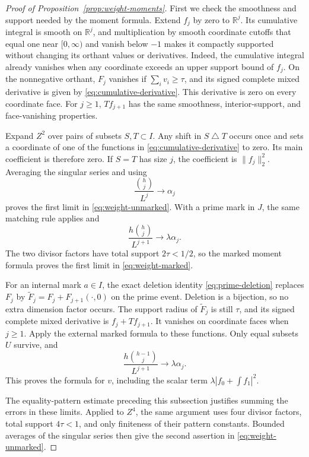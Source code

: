 \begin{proof}[Proof of Proposition~\ref{prop:weight-moments}]
First we check the smoothness and support needed by the moment
formula.  Extend $f_j$ by zero to $\mathbb R^j$.  Its cumulative integral
is smooth on $\mathbb R^j$, and multiplication by smooth coordinate
cutoffs that equal one near $[0,\infty)$ and vanish below $-1$ makes it
compactly supported without changing its orthant values or derivatives.
Indeed, the cumulative integral already vanishes when any coordinate
exceeds an upper support bound of $f_j$.  On the nonnegative orthant,
$F_j$ vanishes if $\sum_i v_i\ge\tau$, and its signed complete mixed derivative is given by
\eqref{eq:cumulative-derivative}.
This derivative is zero on every coordinate face.  For $j\ge1$,
$Tf_{j+1}$ has the same smoothness, interior-support, and face-vanishing
properties.

Expand $Z^2$ over pairs of subsets $S,T\subset I$.  Any shift in
$S\mathbin\triangle T$ occurs once and sets a coordinate of one of the
functions in \eqref{eq:cumulative-derivative} to zero.  Its main
coefficient is therefore zero.  If $S=T$ has size $j$, the coefficient
is $\|f_j\|_2^2$.  Averaging the singular series and using
\[
 \frac{\binom hj}{L^j}\longrightarrow\alpha_j
\]
proves the first limit in \eqref{eq:weight-unmarked}.  With a prime mark
in $J$, the same matching rule applies and
\[
 \frac{h\binom hj}{L^{j+1}}\longrightarrow\lambda\alpha_j.
\]
The two divisor factors have total support $2\tau<1/2$, so the marked
moment formula proves the first limit in \eqref{eq:weight-marked}.

For an internal mark $a\in I$, the exact deletion identity
\eqref{eq:prime-deletion} replaces $F_j$ by
$\widetilde F_j=F_j+F_{j+1}(\cdot,0)$ on the prime event.
Deletion is a bijection, so no extra dimension factor occurs.  The
support radius of $\widetilde F_j$ is still $\tau$, and its signed
complete mixed derivative is $f_j+Tf_{j+1}$.  It vanishes on coordinate
faces when $j\ge1$.  Apply the external marked formula to these
functions.  Only equal subsets $U$ survive, and
\[
 \frac{h\binom{h-1}{j}}{L^{j+1}}\longrightarrow\lambda\alpha_j.
\]
This proves the formula for $v$, including the scalar term
$\lambda|f_0+\int f_1|^2$.

The equality-pattern estimate preceding this subsection justifies
summing the errors in these limits. Applied to $Z^4$, the same argument
uses four divisor factors, total support
$4\tau<1$, and only finiteness of their pattern constants.  Bounded
averages of the singular series then give the second assertion in
\eqref{eq:weight-unmarked}.


\end{proof}
